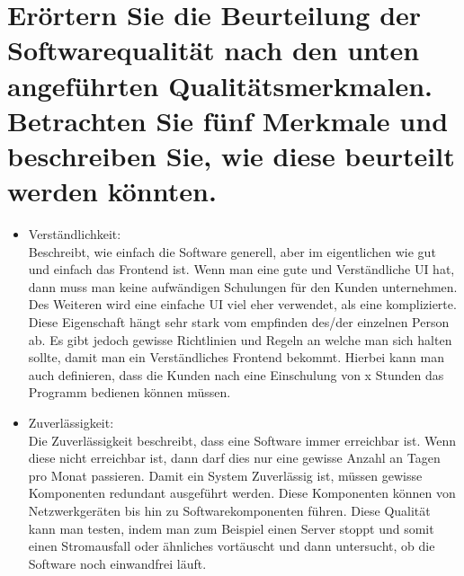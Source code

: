 \documentclass[12pt]{article}
\begin{document}
\section{Erörtern Sie die Beurteilung der Softwarequalität nach den unten angeführten Qualitätsmerkmalen. Betrachten Sie fünf Merkmale und beschreiben Sie, wie diese beurteilt werden könnten.}
\begin{itemize}
 \item Verständlichkeit:\\
 Beschreibt, wie einfach die Software generell, aber im eigentlichen wie gut und einfach das Frontend ist. Wenn man eine gute und Verständliche UI hat, dann muss man keine aufwändigen Schulungen für den Kunden unternehmen. Des Weiteren wird eine einfache UI viel eher verwendet, als eine komplizierte. Diese Eigenschaft hängt sehr stark vom empfinden des/der einzelnen Person ab. Es gibt jedoch gewisse Richtlinien und Regeln an welche man sich halten sollte, damit man ein Verständliches Frontend bekommt. Hierbei kann man auch definieren, dass die Kunden nach eine Einschulung von x Stunden das Programm bedienen können müssen.
 \item Zuverlässigkeit:\\
 Die Zuverlässigkeit beschreibt, dass eine Software immer erreichbar ist. Wenn diese nicht erreichbar ist, dann darf dies nur eine gewisse Anzahl an Tagen pro Monat passieren. Damit ein System Zuverlässig ist, müssen gewisse Komponenten redundant ausgeführt werden. Diese Komponenten können von Netzwerkgeräten bis hin zu Softwarekomponenten führen. Diese Qualität kann man testen, indem man zum Beispiel einen Server stoppt und somit einen Stromausfall oder ähnliches vortäuscht und dann untersucht, ob die Software noch einwandfrei läuft.
\end{itemize}
\pagebreak
\end{document}
